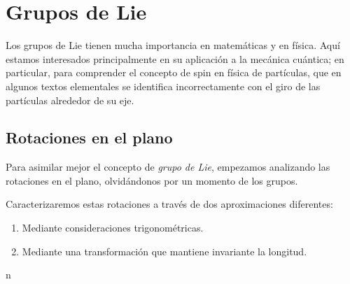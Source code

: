 %
%

\chapter{Grupos de Lie}
Los grupos de Lie tienen mucha importancia en matemáticas y en física.
Aquí estamos interesados principalmente en su aplicación a la mecánica cuántica; en particular, para comprender el concepto de spin en física de partículas, que en algunos textos elementales se identifica incorrectamente con el giro de las partículas alrededor de su eje.

\section{Rotaciones en el plano}
Para asimilar mejor el concepto de \emph{grupo de Lie}, empezamos analizando las rotaciones en el plano, olvidándonos por un momento de los grupos.

Caracterizaremos estas rotaciones a través de dos aproximaciones diferentes:
\begin{enumerate}
\item Mediante consideraciones trigonométricas.
\item Mediante una transformación que mantiene invariante la longitud.
\end{enumerate}
n
